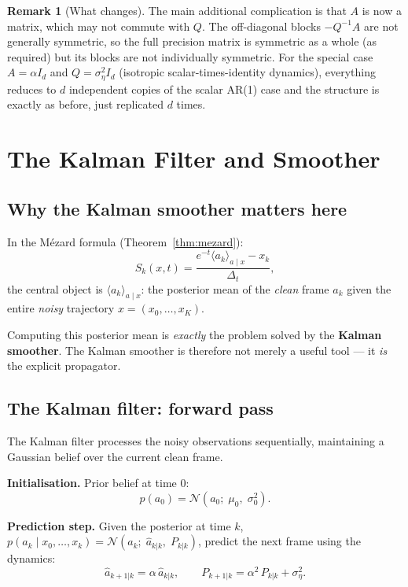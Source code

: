 \documentclass[12pt, a4paper]{article}
\def\ba{a}%
\def\bx{x}%
\def\bm#1{#1}%
\theoremstyle{definition}
\newtheorem{remark}{Remark}[section]
\newcommand{\N}{\mathcal{N}}
\newcommand{\ba}{\bm{a}}
\newcommand{\bx}{\bm{x}}
\newcommand{\dt}{\Delta_t}
\begin{document}
\begin{remark}[What changes]
The main additional complication is that $A$ is now a matrix, which
may not commute with $Q$. The off-diagonal blocks $-Q^{-1}A$ are
not generally symmetric, so the full precision matrix is symmetric
as a whole (as required) but its blocks are not individually symmetric.
For the special case $A = \alpha I_d$ and $Q = \sigma_\eta^2 I_d$
(isotropic scalar-times-identity dynamics), everything reduces to $d$
independent copies of the scalar AR(1) case and the structure is
exactly as before, just replicated $d$ times.
\end{remark}

\section{The Kalman Filter and Smoother}
\label{sec:kalman}

\subsection{Why the Kalman smoother matters here}

In the Mézard formula (Theorem~\ref{thm:mezard}):
\[
  S_k(\bx,t) = \frac{e^{-t}\langle a_k\rangle_{\ba\mid\bx} - x_k}{\dt},
\]
the central object is $\langle a_k\rangle_{\ba\mid\bx}$: the posterior
mean of the \emph{clean} frame $a_k$ given the entire \emph{noisy}
trajectory $\bx = (x_0,\ldots,x_K)$.

Computing this posterior mean is \emph{exactly} the problem solved
by the \textbf{Kalman smoother}. The Kalman smoother is therefore
not merely a useful tool — it \emph{is} the explicit propagator.

\subsection{The Kalman filter: forward pass}

The Kalman filter processes the noisy observations sequentially,
maintaining a Gaussian belief over the current clean frame.

\medskip
\noindent\textbf{Initialisation.} Prior belief at time $0$:
\[
  p(a_0) = \N(a_0;\;\mu_0,\;\sigma_0^2).
\]

\noindent\textbf{Prediction step.} Given the posterior at time $k$,
$p(a_k\mid x_0,\ldots,x_k) = \N(a_k;\;\hat{a}_{k|k},\;P_{k|k})$,
predict the next frame using the dynamics:
\[
  \hat{a}_{k+1|k} = \alpha\,\hat{a}_{k|k},
  \qquad
  P_{k+1|k} = \alpha^2\,P_{k|k} + \sigma_\eta^2.
\]
\end{document}
